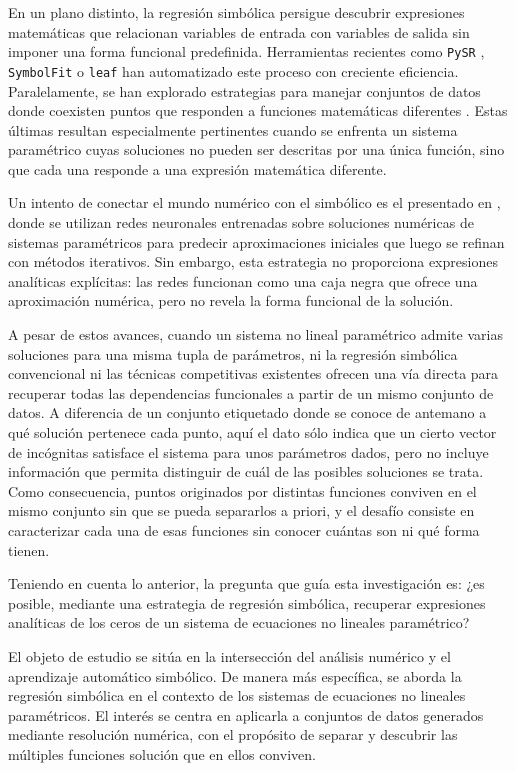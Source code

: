 \documentclass[12pt,a4paper]{article} \usepackage[utf8]{inputenc} \usepackage[spanish]{babel} \usepackage{amsmath, amssymb, amsthm} \usepackage{bm} \usepackage{float} \usepackage{longtable} \usepackage[hidelinks]{hyperref}
\begin{document}
En un plano distinto, la regresión simbólica \cite{koza1992genetic}
persigue descubrir expresiones matemáticas que relacionan variables de
entrada con variables de salida sin imponer una forma funcional
predefinida.  Herramientas recientes como \texttt{PySR}
\cite{cranmer2023pysr}, \texttt{SymbolFit} \cite{diniz2025symbolfit} o
\texttt{leaf} \cite{leaf2024} han automatizado este proceso con
creciente eficiencia.  Paralelamente, se han explorado estrategias para
manejar conjuntos de datos donde coexisten puntos que responden a
funciones matemáticas diferentes \cite{ukorigho2023competitive}.  Estas
últimas resultan especialmente pertinentes cuando se enfrenta un
sistema paramétrico cuyas soluciones no pueden ser descritas por una
única función, sino que cada una responde a una expresión matemática
diferente.

Un intento de conectar el mundo numérico con el simbólico es el
presentado en \cite{merlet2024mixing}, donde se utilizan redes
neuronales entrenadas sobre soluciones numéricas de sistemas
paramétricos para predecir aproximaciones iniciales que luego se
refinan con métodos iterativos.  Sin embargo, esta estrategia no
proporciona expresiones analíticas explícitas: las redes funcionan como
una caja negra que ofrece una aproximación numérica, pero no revela la
forma funcional de la solución.

A pesar de estos avances, cuando un sistema no lineal paramétrico
admite varias soluciones para una misma tupla de parámetros, ni la
regresión simbólica convencional ni las técnicas competitivas
existentes ofrecen una vía directa para recuperar todas las
dependencias funcionales a partir de un mismo conjunto de datos.  A
diferencia de un conjunto etiquetado donde se conoce de antemano a qué
solución pertenece cada punto, aquí el dato sólo indica que un cierto
vector de incógnitas satisface el sistema para unos parámetros dados,
pero no incluye información que permita distinguir de cuál de las
posibles soluciones se trata.  Como consecuencia, puntos originados por
distintas funciones conviven en el mismo conjunto sin que se pueda
separarlos a priori, y el desafío consiste en caracterizar cada una de
esas funciones sin conocer cuántas son ni qué forma tienen.

Teniendo en cuenta lo anterior, la pregunta que guía esta investigación
es: ¿es posible, mediante una estrategia de regresión simbólica,
recuperar expresiones analíticas de los ceros de un sistema de
ecuaciones no lineales paramétrico?

El objeto de estudio se sitúa en la intersección del análisis numérico
y el aprendizaje automático simbólico.  De manera más específica, se
aborda la regresión simbólica en el contexto de los sistemas de
ecuaciones no lineales paramétricos.  El interés se centra en aplicarla
a conjuntos de datos generados mediante resolución numérica, con el
propósito de separar y descubrir las múltiples funciones solución que
en ellos conviven.
\end{document}
